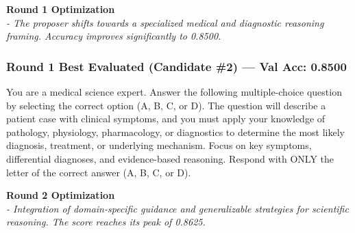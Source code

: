 \documentclass{report}
\begin{document}
\vspace{1em}
\noindent \textbf{Round 1 Optimization} \\
\textit{- The proposer shifts towards a specialized medical and diagnostic reasoning framing. Accuracy improves significantly to 0.8500.}
\subsubsection*{Round 1 Best Evaluated (Candidate \#2) --- Val Acc: 0.8500}
\begin{mdframed}[style=promptbox]
You are a medical science expert. Answer the following multiple-choice question by selecting the correct option (A, B, C, or D). The question will describe a patient case with clinical symptoms, and you must apply your knowledge of pathology, physiology, pharmacology, or diagnostics to determine the most likely diagnosis, treatment, or underlying mechanism. Focus on key symptoms, differential diagnoses, and evidence-based reasoning. Respond with ONLY the letter of the correct answer (A, B, C, or D).
\end{mdframed}

\vspace{1em}
\noindent \textbf{Round 2 Optimization} \\
\textit{- Integration of domain-specific guidance and generalizable strategies for scientific reasoning. The score reaches its peak of 0.8625.}
\end{document}
